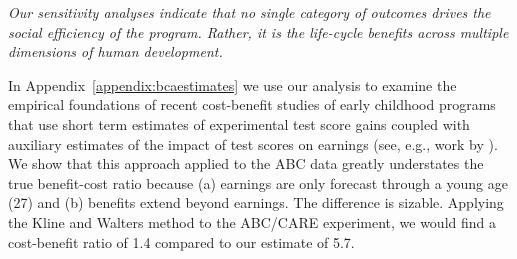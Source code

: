\textit{Our sensitivity analyses indicate that no single category of outcomes drives the social efficiency of the program. Rather, it is the life-cycle benefits across multiple dimensions of human development.}

In Appendix~\ref{appendix:bcaestimates} we use our analysis to examine the empirical foundations of recent cost-benefit studies of early childhood programs that use short term estimates of experimental test score gains coupled with auxiliary estimates of the impact of test scores on earnings (see, e.g., work by \citealp{Kline_Walters_2016_QJE}). We show that this approach applied to the ABC data greatly understates the true benefit-cost ratio because (a) earnings are only forecast through a young age (27) and (b) benefits extend beyond earnings. The difference is sizable. Applying the Kline and Walters method to the ABC/CARE experiment, we would find a cost-benefit ratio of 1.4 compared to our estimate of 5.7.

